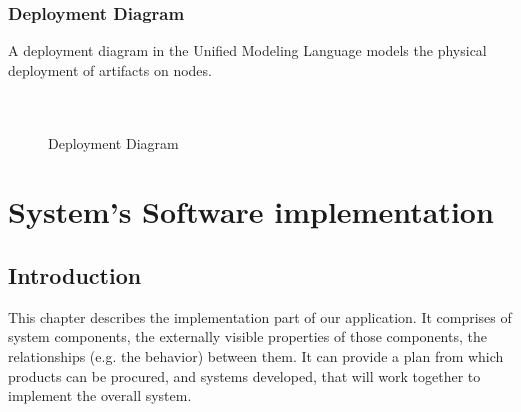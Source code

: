 \documentclass{SureshLimkar}
\begin{document}
\subsection{Deployment Diagram}
 A deployment diagram in the Unified Modeling Language models the physical deployment of artifacts on nodes. \\ \\ \\
\begin{figure}[h]%
\centering
{}%
\caption{Deployment Diagram}%
\label{Deployment Diagram}%
\end{figure}
\newpage

\chapter{System's Software implementation}


\section{Introduction}
\hspace{0.5 in} This chapter describes the implementation part of our application. It comprises of system components, the externally visible properties of those components, the relationships (e.g. the behavior) between them. It can provide a plan from which products can be procured, and systems developed, that will work together to implement the overall system.
\\
\newpage
\end{document}
